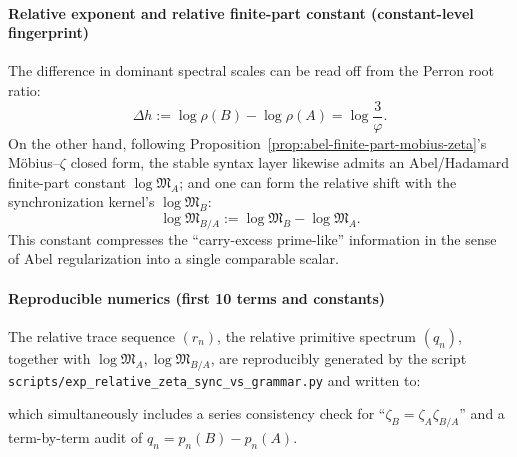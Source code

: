 \begin{remark}
\paragraph{Relative exponent and relative finite-part constant (constant-level fingerprint)}
The difference in dominant spectral scales can be read off from the Perron root ratio:
\[
\Delta h:=\log\rho(B)-\log\rho(A)=\log\frac{3}{\varphi}.
\]
On the other hand, following Proposition~\ref{prop:abel-finite-part-mobius-zeta}'s M\"obius--\(\zeta\) closed form,
the stable syntax layer likewise admits an Abel/Hadamard finite-part constant \(\log\mathfrak{M}_A\);
and one can form the relative shift with the synchronization kernel's \(\log\mathfrak{M}_B\):
\[
\log\mathfrak{M}_{B/A}:=\log\mathfrak{M}_B-\log\mathfrak{M}_A.
\]
This constant compresses the ``carry-excess prime-like'' information in the sense of Abel regularization into a single comparable scalar.

\paragraph{Reproducible numerics (first 10 terms and constants)}
The relative trace sequence \((r_n)\), the relative primitive spectrum \((q_n)\), together with \(\log\mathfrak{M}_A,\log\mathfrak{M}_{B/A}\), are reproducibly generated by the script
\texttt{scripts/exp\_relative\_zeta\_sync\_vs\_grammar.py} and written to:

which simultaneously includes a series consistency check for ``\(\zeta_B=\zeta_A\zeta_{B/A}\)'' and a term-by-term audit of \(q_n=p_n(B)-p_n(A)\).
\end{remark}

